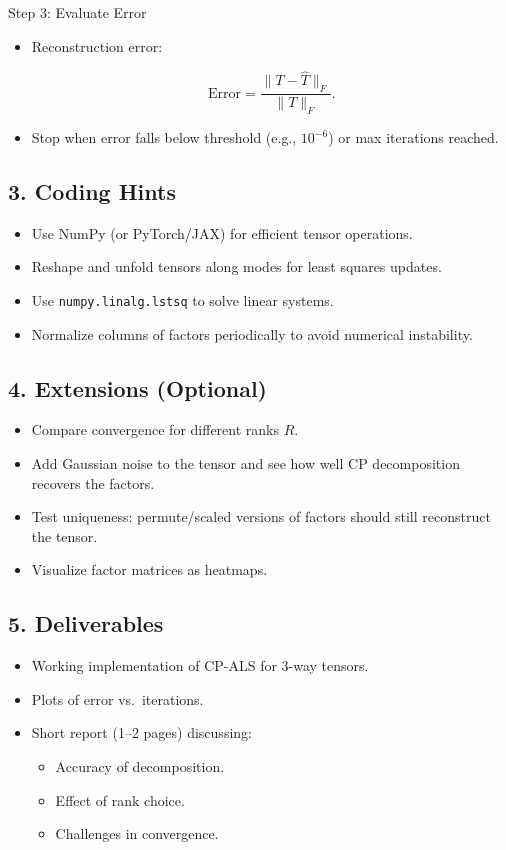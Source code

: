 \documentclass[
  letterpaper,
  DIV=11,
  numbers=noendperiod]{scrreprt}
\providecommand{\tightlist}{%
  \setlength{\itemsep}{0pt}\setlength{\parskip}{0pt}}
\begin{document}
Step 3: Evaluate Error

\begin{itemize}
\item
  Reconstruction error:

  \[
  \text{Error} = \frac{\|T - \hat{T}\|_F}{\|T\|_F}.
  \]
\item
  Stop when error falls below threshold (e.g., \(10^{-6}\)) or max
  iterations reached.
\end{itemize}

\subsection{3. Coding Hints}\label{coding-hints}

\begin{itemize}
\tightlist
\item
  Use NumPy (or PyTorch/JAX) for efficient tensor operations.
\item
  Reshape and unfold tensors along modes for least squares updates.
\item
  Use \texttt{numpy.linalg.lstsq} to solve linear systems.
\item
  Normalize columns of factors periodically to avoid numerical
  instability.
\end{itemize}

\subsection{4. Extensions (Optional)}\label{extensions-optional}

\begin{itemize}
\tightlist
\item
  Compare convergence for different ranks \(R\).
\item
  Add Gaussian noise to the tensor and see how well CP decomposition
  recovers the factors.
\item
  Test uniqueness: permute/scaled versions of factors should still
  reconstruct the tensor.
\item
  Visualize factor matrices as heatmaps.
\end{itemize}

\subsection{5. Deliverables}\label{deliverables}

\begin{itemize}
\item
  Working implementation of CP-ALS for 3-way tensors.
\item
  Plots of error vs.~iterations.
\item
  Short report (1--2 pages) discussing:

  \begin{itemize}
  \tightlist
  \item
    Accuracy of decomposition.
  \item
    Effect of rank choice.
  \item
    Challenges in convergence.
  \end{itemize}
\end{itemize}
\end{document}
